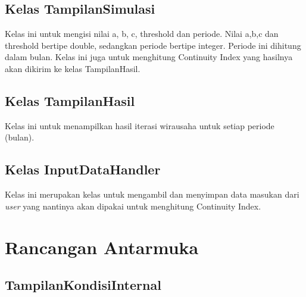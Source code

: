 \subsection{Kelas TampilanSimulasi}
Kelas ini untuk mengisi nilai a, b, c, threshold dan periode. Nilai a,b,c dan threshold bertipe double, sedangkan periode bertipe integer. Periode ini dihitung dalam bulan. Kelas ini juga untuk menghitung Continuity Index yang hasilnya akan dikirim ke kelas TampilanHasil.
\subsection{Kelas TampilanHasil}
Kelas ini untuk menampilkan hasil iterasi wirausaha untuk setiap periode (bulan).
\subsection{Kelas InputDataHandler}
Kelas ini merupakan kelas untuk mengambil dan menyimpan data masukan dari \textit{user} yang nantinya akan dipakai untuk menghitung Continuity Index.


\section{Rancangan Antarmuka}
\label{sec:rancanganantarmuka}

\subsection{TampilanKondisiInternal}

